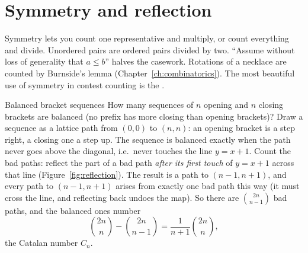 \section[Symmetry and reflection]{Symmetry and reflection \hfill \gold}\label{sec:symmetry}

Symmetry lets you count one representative and multiply, or count everything and divide. Unordered pairs are ordered pairs
divided by two. ``Assume without loss of generality that $a \le b$'' halves the casework. Rotations of a necklace are
counted by Burnside's lemma (Chapter~\ref{ch:combinatorics}). The most beautiful use of symmetry in contest counting is the
.

\begin{problem}{Balanced bracket sequences}
How many sequences of $n$ opening and $n$ closing brackets are balanced (no prefix has more closing than opening brackets)?
\solution Draw a sequence as a lattice path from $(0, 0)$ to $(n, n)$: an opening bracket is a step right, a closing one a
step up. The sequence is balanced exactly when the path never goes above the diagonal, i.e.\ never touches the line
$y = x + 1$. Count the bad paths: reflect the part of a bad path \emph{after its first touch} of $y = x + 1$ across that
line (Figure~\ref{fig:reflection}). The result is a path to $(n - 1, n + 1)$, and every path to $(n - 1, n + 1)$ arises from
exactly one bad path this way (it must cross the line, and reflecting back undoes the map). So there are $\binom{2n}{n-1}$
bad paths, and the balanced ones number
\[ \binom{2n}{n} - \binom{2n}{n-1} = \frac{1}{n + 1}\binom{2n}{n}, \]
the Catalan number $C_n$.
\end{problem}


